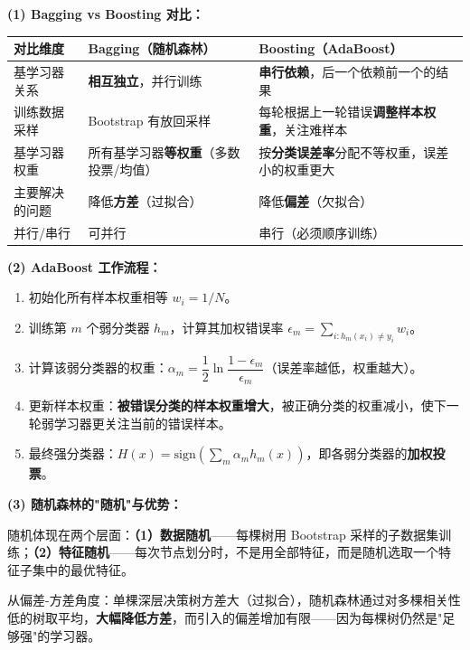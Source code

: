 \documentclass[a4paper,11pt]{ctexart}
\begin{document}
\begin{solutionbox}[参考答案与详细解析]
    \textbf{(1) Bagging vs Boosting 对比：}

    \begin{center}
    \begin{tabular}{p{3.5cm} p{4.2cm} p{4.2cm}}
        \toprule
        对比维度 & Bagging（随机森林） & Boosting（AdaBoost） \\
        \midrule
        基学习器关系 & \textbf{相互独立}，并行训练 & \textbf{串行依赖}，后一个依赖前一个的结果 \\[0.8em]
        训练数据采样 & Bootstrap 有放回采样 & 每轮根据上一轮错误\textbf{调整样本权重}，关注难样本 \\[0.8em]
        基学习器权重 & 所有基学习器\textbf{等权重}（多数投票/均值） & 按\textbf{分类误差率}分配不等权重，误差小的权重更大 \\[0.8em]
        主要解决的问题 & 降低\textbf{方差}（过拟合） & 降低\textbf{偏差}（欠拟合） \\[0.8em]
        并行/串行 & 可并行 & 串行（必须顺序训练） \\
        \bottomrule
    \end{tabular}
    \end{center}

    \textbf{(2) AdaBoost 工作流程：}

    \begin{enumerate}
        \item 初始化所有样本权重相等 $w_i = 1/N$。
        \item 训练第 $m$ 个弱分类器 $h_m$，计算其加权错误率 $\epsilon_m = \sum_{i: h_m(x_i)\neq y_i} w_i$。
        \item 计算该弱分类器的权重：$\alpha_m = \dfrac{1}{2}\ln\dfrac{1-\epsilon_m}{\epsilon_m}$（误差率越低，权重越大）。
        \item 更新样本权重：\textbf{被错误分类的样本权重增大}，被正确分类的权重减小，使下一轮弱学习器更关注当前的错误样本。
        \item 最终强分类器：$H(x) = \text{sign}\left(\sum_m \alpha_m h_m(x)\right)$，即各弱分类器的\textbf{加权投票}。
    \end{enumerate}

    \textbf{(3) 随机森林的"随机"与优势：}

    随机体现在两个层面：\textbf{（1）数据随机}——每棵树用 Bootstrap 采样的子数据集训练；\textbf{（2）特征随机}——每次节点划分时，不是用全部特征，而是随机选取一个特征子集中的最优特征。

    从偏差-方差角度：单棵深层决策树方差大（过拟合），随机森林通过对多棵相关性低的树取平均，\textbf{大幅降低方差}，而引入的偏差增加有限——因为每棵树仍然是"足够强"的学习器。


\end{solutionbox}
\end{document}
